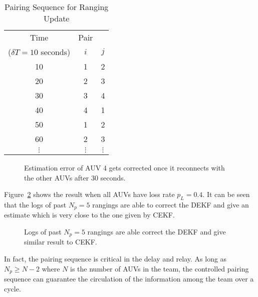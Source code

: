 \begin{table}[htbp] 
\begin{center}
\caption{Pairing Sequence for Ranging Update}
\label{tab:pair}
\begin{tabular}{|c|cc|}
  \hline
  Time & Pair &  \\
  ($\delta T=10$ seconds) & $i$ & $j$ \\ \hline
  10 & 1 & 2 \\
  20 & 2 & 3 \\
  30 & 3 & 4 \\
  40 & 4 & 1 \\
  50 & 1 & 2 \\
  60 & 2 & 3 \\
  $\vdots$ & $\vdots$ & $\vdots$\\
   \hline
\end{tabular}
\end{center}
\end{table}

\begin{figure}[htbp]
\centering
{}
\caption{Estimation error of AUV 4 gets corrected once it reconnects with the other AUVs after 30 seconds.}
\label{fig:L1000AUV4lossRate1}
\end{figure}

Figure~\ref{fig:smLdot4} shows the result when all AUVs have loss rate $p_L=0.4$. It can be seen that the logs of past $N_p=5$ rangings are able to correct the DEKF and give an estimate which is very close to the one given by CEKF.
\begin{figure}[htbp]
\centering
{}
\caption{Logs of past $N_p=5$ rangings are able correct the DEKF and give similar result to CEKF.}
\label{fig:smLdot4}
\end{figure}

In fact, the pairing sequence is critical in the delay and relay. As long as $N_p\geq N-2$ where $N$ is the number of AUVs in the team, the controlled pairing sequence can guarantee the circulation of the information among the team over a cycle. 

